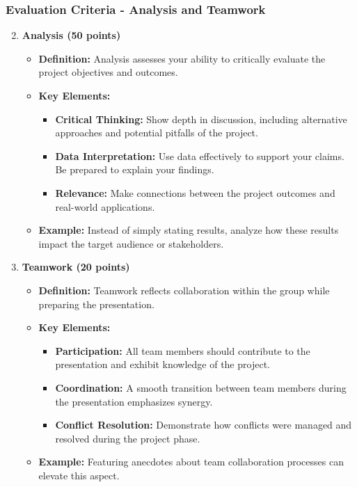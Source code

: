 \documentclass[aspectratio=169]{beamer}
\begin{document}
\begin{frame}[fragile]
    \frametitle{Evaluation Criteria - Analysis and Teamwork}
    \begin{enumerate}
        \setcounter{enumi}{1}
        \item \textbf{Analysis (50 points)}
            \begin{itemize}
                \item \textbf{Definition:} Analysis assesses your ability to critically evaluate the project objectives and outcomes.
                \item \textbf{Key Elements:}
                    \begin{itemize}
                        \item \textbf{Critical Thinking:} Show depth in discussion, including alternative approaches and potential pitfalls of the project.
                        \item \textbf{Data Interpretation:} Use data effectively to support your claims. Be prepared to explain your findings.
                        \item \textbf{Relevance:} Make connections between the project outcomes and real-world applications.
                    \end{itemize}
                \item \textbf{Example:} Instead of simply stating results, analyze how these results impact the target audience or stakeholders.
            \end{itemize}

        \item \textbf{Teamwork (20 points)}
            \begin{itemize}
                \item \textbf{Definition:} Teamwork reflects collaboration within the group while preparing the presentation.
                \item \textbf{Key Elements:}
                    \begin{itemize}
                        \item \textbf{Participation:} All team members should contribute to the presentation and exhibit knowledge of the project.
                        \item \textbf{Coordination:} A smooth transition between team members during the presentation emphasizes synergy.
                        \item \textbf{Conflict Resolution:} Demonstrate how conflicts were managed and resolved during the project phase.
                    \end{itemize}
                \item \textbf{Example:} Featuring anecdotes about team collaboration processes can elevate this aspect.
            \end{itemize}
    \end{enumerate}
\end{frame}
\end{document}
